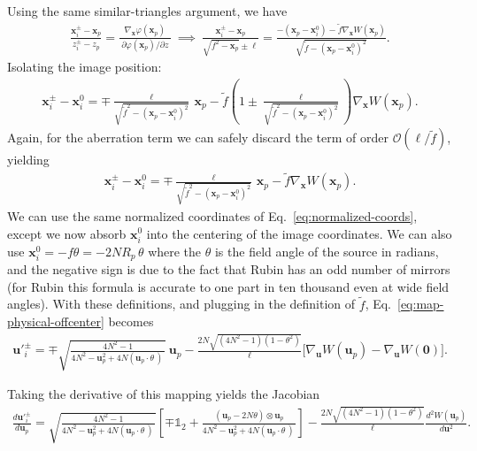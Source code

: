 \documentclass[TS,authoryear,toc]{lsstdoc}
\begin{document}
Using the same similar-triangles argument, we have
\begin{align}
    \frac{
        \mathbf{x}_i^\pm - \mathbf{x}_p
    }{
        z_i^\pm - z_p
    } = \frac{
        \nabla_\mathbf{x} \varphi(\mathbf{x}_p)
    }{
        ~ \partial \varphi(\mathbf{x}_p) / \partial z ~
    }
    ~ \implies ~ 
    \frac{
        \mathbf{x}_i^\pm - \mathbf{x}_p
    }{
        \sqrt{f^2 - \mathbf{x}_p} \pm \ell
    } = 
    \frac{
        - (\mathbf{x}_p - \mathbf{x}_i^0) - \tilde{f} \nabla_\mathbf{x} W(\mathbf{x}_p)
    }{
        \sqrt{\tilde{f} - (\mathbf{x}_p - \mathbf{x}_i^0)^2}
    }.
\end{align}
Isolating the image position:
\begin{align}
    \mathbf{x}_i^\pm - \mathbf{x}_i^0 = \mp \frac{\ell}{\sqrt{\tilde{f}^2 - (\mathbf{x}_p - \mathbf{x}_i^0)^2}} \, \mathbf{x}_p - \tilde{f} \left( 1 \pm \frac{\ell}{\sqrt{\tilde{f}^2 - (\mathbf{x}_p - \mathbf{x}_i^0)^2}} \right) \nabla_\mathbf{x} W(\mathbf{x}_p).
\end{align}
Again, for the aberration term we can safely discard the term of order $\mathcal{O}(\ell / \tilde{f})$, yielding
\begin{align}
    \mathbf{x}_i^\pm - \mathbf{x}_i^0 = \mp \frac{\ell}{\sqrt{\tilde{f}^2 - (\mathbf{x}_p - \mathbf{x}_i^0)^2}} \, \mathbf{x}_p - \tilde{f} \nabla_\mathbf{x} W(\mathbf{x}_p).
    \label{eq:map-physical-offcenter}
\end{align}
We can use the same normalized coordinates of Eq.~\ref{eq:normalized-coords}, except we now absorb $\mathbf{x}_i^0$ into the centering of the image coordinates.
We can also use $\mathbf{x}_i^0 = -f \theta = -2 N R_p \, \theta$ where the $\theta$ is the field angle of the source in radians, and the negative sign is due to the fact that Rubin has an odd number of mirrors (for Rubin this formula is accurate to one part in ten thousand even at wide field angles).
With these definitions, and plugging in the definition of $\tilde{f}$, Eq.~\ref{eq:map-physical-offcenter} becomes
\begin{align}
    \mathbf{u'}_{\!i}^\pm = \mp \sqrt{\frac{4 N^2 - 1}{4 N^2 - \mathbf{u}_p^2 + 4 N (\mathbf{u}_p \!\cdot \theta\,)\,}} ~ \mathbf{u}_p - \frac{2 N \sqrt{(4 N^2 - 1)(1 - \theta^2)}}{\ell} \Big[ \nabla_\mathbf{u} W(\mathbf{u}_p) - \nabla_\mathbf{u} W(\mathbf{0}) \Big].
\end{align}

Taking the derivative of this mapping yields the Jacobian
\begin{align}
    \frac{d\mathbf{u'}_{\!i}^\pm}{d\mathbf{u}_p} = 
    \sqrt{\frac{4 N^2 - 1}{4 N^2 - \mathbf{u}_p^2 + 4 N (\mathbf{u}_p \!\cdot \theta\,)\,}} \left[
        \mp \mathds{1}_2 + \frac{(\mathbf{u}_p - 2 N \theta) \otimes \mathbf{u}_p}{4 N^2 - \mathbf{u}_p^2 + 4 N (\mathbf{u}_p \!\cdot \theta\,)\,}
    \right]
    - \frac{2 N \sqrt{(4 N^2 - 1)(1 - \theta^2)}}{\ell} \frac{d^2 W(\mathbf{u}_p)}{d \mathbf{u}^2}.
\end{align}
\end{document}

